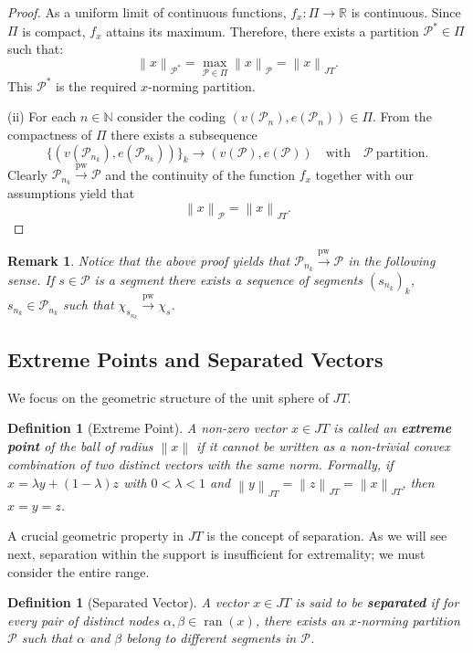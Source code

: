 \documentclass[11pt,a4paper]{amsart}
\newtheorem{definition}[theorem]{Definition}
\newtheorem{remark}[theorem]{Remark}
\newcommand{\JT}{JT}
\newcommand{\norm}[1]{\left\lVert#1\right\rVert}
\newcommand{\ran}{\operatorname{ran}}
\begin{document}
\begin{proof}
    As a uniform limit of continuous functions, $f_x: \Pi \to \mathbb{R}$ is continuous. Since $\Pi$ is compact, $f_x$ attains its maximum. Therefore, there exists a partition $\mathcal{P}^* \in \Pi$ such that:
    \[ \norm{x}_{\mathcal{P}^*} = \max_{\mathcal{P} \in \Pi} \norm{x}_{\mathcal{P}} = \norm{x}_{\JT}. \]
    This $\mathcal{P}^*$ is the required $x$-norming partition.
    
    (ii) For each $n\in \mathbb{N}$ consider the coding $(v(\mathcal{P}_n),  e( \mathcal{P}_n )) \in \Pi$. From the compactness of $\Pi$ there exists a subsequence 
    \[  \{ (v (\mathcal{P}_{n_k}), e(\mathcal{P}_{n_k} )) \}_k  \to  ( v (\mathcal{P}), e(\mathcal{P})) \quad \text{with}  
    \quad \mathcal{P} \: \text{partition}. \]
  Clearly $ \mathcal{P}_{n_k} \xrightarrow{\text{pw}} \mathcal{P}$ and the continuity of the function $f_x$ together with our assumptions yield that 
    \[ \norm{x}_\mathcal{P} = \norm{x}_{\JT}. \]
\end{proof}
\begin{remark} \label{Re1} Notice that the above proof yields that $\mathcal{P}_{n_k}  \xrightarrow{\text{pw}} \mathcal{P}$ in the following sense. If $s\in \mathcal{P}$ is a segment there exists a sequence of segments $(s_{n_k})_k$, $s_{n_k} \in \mathcal{P}_{n_k}$ such that $\chi_{s_{n_k}} \xrightarrow{\text{pw}} \chi_s$.
\end{remark}


\subsection{Extreme Points and Separated Vectors}

We focus on the geometric structure of the unit sphere of $\JT$.

\begin{definition}[Extreme Point]
    A non-zero vector $x \in \JT$ is called an \textbf{extreme point} of the ball of radius $\norm{x}$ if it cannot be written as a non-trivial convex combination of two distinct vectors with the same norm. Formally, if $x = \lambda y + (1-\lambda)z$ with $0 < \lambda < 1$ and $\norm{y}_{\JT} = \norm{z}_{\JT} = \norm{x}_{\JT}$, then $x = y = z$.
\end{definition}

A crucial geometric property in $\JT$ is the concept of separation. As we will see next, separation within the support is insufficient for extremality; we must consider the entire range.

\begin{definition}[Separated Vector]
    A vector $x \in \JT$ is said to be \textbf{separated} if for every pair of distinct nodes $\alpha, \beta \in \ran(x)$, there exists an $x$-norming partition $\mathcal{P}$ such that $\alpha$ and $\beta$ belong to different segments in $\mathcal{P}$.
\end{definition}
\end{document}
